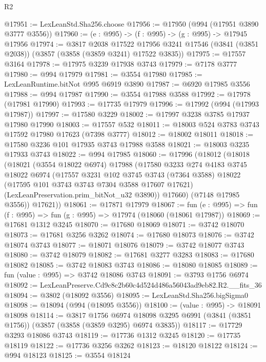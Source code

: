 \begin{lexlean}{R2}
\begin{coremodule}
@17951 := LexLeanStd.Sha256.choose
@17956 := @17950 (@994 (@17951 @3890 @3777 @3556))
@17960 := (e : @995) -> (f : @995) -> (g : @995) -> @17945 @17956
@17974 := @3817
    @2038
    @17522
    @17956
    @3241
    @17546
    (@3841 (@3851 @2038))
    (@3857 (@3858 (@3859 @3241) @17522 @3835))
@17975 := @17557 @3164
@17978 := @17975 @3239 @17938 @3743
@17979 := @7178 @3777
@17980 := @994 @17979
@17981 := @3554 @17980
@17985 := LexLeanRuntime.bitNot @995 @6919 @3890
@17987 := @6920 @17985 @3556
@17988 := @994 @17987
@17990 := @3554 @17988 @3588
@17992 := @17978 (@17981 @17990)
@17993 := @17735 @17979
@17996 := @17992 (@994 (@17993 @17987))
@17997 := @17580 @3229
@18002 := @17997 @3238 @3785 @17937 @17980 @17990
@18003 := @17557 @532
@18011 := @18003 @524 @3783 @3743 @17592 @17980 @17623 (@7398 @3777)
@18012 := @18002 @18011
@18018 := @17580 @3236 @101 @17935 @3743 @17988 @3588
@18021 := @18003 @3235 @17933 @3743
@18022 := @994 @17985
@18060 := @17996
    (@18012
      (@18018
        (@18021
          (@3554 @18022 @6974)
          @17988
          (@17580
            @3233
            @274
            @4183
            @3745
            @18022
            @6974
            (@17557
              @3231
              @102
              @3745
              @3743
              (@7364 @3588)
              @18022
              (@17595 @101 @3743 @3743 @7304 @3588 @17607 @17621)
              (LexLeanPreservation.prim_bitNot_u32 @3890))
            @17660)
          (@7148 @17985 @3556))
        @17621))
@18061 := @17871 @17979
@18067 := fun (e : @995) => fun (f : @995) => fun (g : @995) => @17974 (@18060 (@18061 @17987))
@18069 := @17681 @1312 @3245
@18070 := @17680 @18069
@18071 := @3742 @18070
@18073 := @17681 @3256 @3262
@18074 := @17680 @18073
@18076 := @3742 @18074 @3743
@18077 := @18071 @18076
@18079 := @3742 @18077 @3743
@18080 := @3742 @18079
@18082 := @17681 @3277 @3283
@18083 := @17680 @18082
@18085 := @3742 @18083 @3743
@18086 := @18080 @18085
@18089 := fun (value : @995) => @3742 @18086 @3743
@18091 := @3793 @1756 @6974
@18092 := LexLeanPreserve.Cd9c8c2b60c4d524d486a56043ad9eb82.R2.__fits_36
@18094 := @3802 (@18092 @3556)
@18095 := LexLeanStd.Sha256.bigSigma0
@18098 := @18094 (@994 (@18095 @3556))
@18100 := (value : @995) -> @18091 @18098
@18114 := @3817
    @1756
    @6974
    @18098
    @3295
    @6991
    (@3841 (@3851 @1756))
    (@3857 (@3858 (@3859 @3295) @6974 @3835))
@18117 := @17729 @3293 @18086 @3743
@18119 := @17736 @1312 @3245
@18120 := @17735 @18119
@18122 := @17736 @3256 @3262
@18123 := @18120 @18122
@18124 := @994 @18123
@18125 := @3554 @18124

\end{coremodule}
\end{lexlean}

